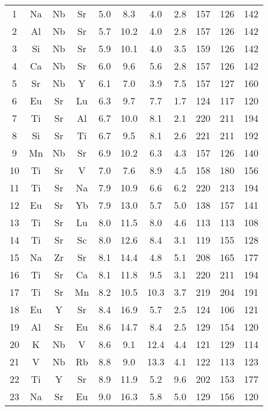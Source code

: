 \begin{center}
\begin{xtabular}{c|ccc|cccc|ccc}
  1 &  Na &  Nb &  Sr & 5.0 & 8.3 & 4.0 & 2.8 & 157 & 126 & 142 \\
  2 &  Al &  Nb &  Sr & 5.7 &  10.2 & 4.0 & 2.8 & 157 & 126 & 142 \\
  3 &  Si &  Nb &  Sr & 5.9 &  10.1 & 4.0 & 3.5 & 159 & 126 & 142 \\
  4 &  Ca &  Nb &  Sr & 6.0 & 9.6 & 5.6 & 2.8 & 157 & 126 & 142 \\
  5 &  Sr &  Nb &   Y & 6.1 & 7.0 & 3.9 & 7.5 & 157 & 127 & 160 \\
  6 &  Eu &  Sr &  Lu & 6.3 & 9.7 & 7.7 & 1.7 & 124 & 117 & 120 \\
  7 &  Ti &  Sr &  Al & 6.7 &  10.0 & 8.1 & 2.1 & 220 & 211 & 194 \\
  8 &  Si &  Sr &  Ti & 6.7 & 9.5 & 8.1 & 2.6 & 221 & 211 & 192 \\
  9 &  Mn &  Nb &  Sr & 6.9 &  10.2 & 6.3 & 4.3 & 157 & 126 & 140 \\
 10 &  Ti &  Sr &   V & 7.0 & 7.6 & 8.9 & 4.5 & 158 & 180 & 156 \\
 11 &  Ti &  Sr &  Na & 7.9 &  10.9 & 6.6 & 6.2 & 220 & 213 & 194 \\
 12 &  Eu &  Sr &  Yb & 7.9 &  13.0 & 5.7 & 5.0 & 138 & 157 & 141 \\
 13 &  Ti &  Sr &  Lu & 8.0 &  11.5 & 8.0 & 4.6 & 113 & 113 & 108 \\
 14 &  Ti &  Sr &  Sc & 8.0 &  12.6 & 8.4 & 3.1 & 119 & 155 & 128 \\
 15 &  Na &  Zr &  Sr & 8.1 &  14.4 & 4.8 & 5.1 & 208 & 165 & 177 \\
 16 &  Ti &  Sr &  Ca & 8.1 &  11.8 & 9.5 & 3.1 & 220 & 211 & 194 \\
 17 &  Ti &  Sr &  Mn & 8.2 &  10.5 &  10.3 & 3.7 & 219 & 204 & 191 \\
 18 &  Eu &   Y &  Sr & 8.4 &  16.9 & 5.7 & 2.5 & 124 & 106 & 121 \\
 19 &  Al &  Sr &  Eu & 8.6 &  14.7 & 8.4 & 2.5 & 129 & 154 & 120 \\
 20 &   K &  Nb &   V & 8.6 & 9.1 &  12.4 & 4.4 & 121 & 129 & 114 \\
 21 &   V &  Nb &  Rb & 8.8 & 9.0 &  13.3 & 4.1 & 122 & 113 & 123 \\
 22 &  Ti &   Y &  Sr & 8.9 &  11.9 & 5.2 & 9.6 & 202 & 153 & 177 \\
 23 &  Na &  Sr &  Eu & 9.0 &  16.3 & 5.8 & 5.0 & 129 & 156 & 120 \\

\end{xtabular}
\end{center}
